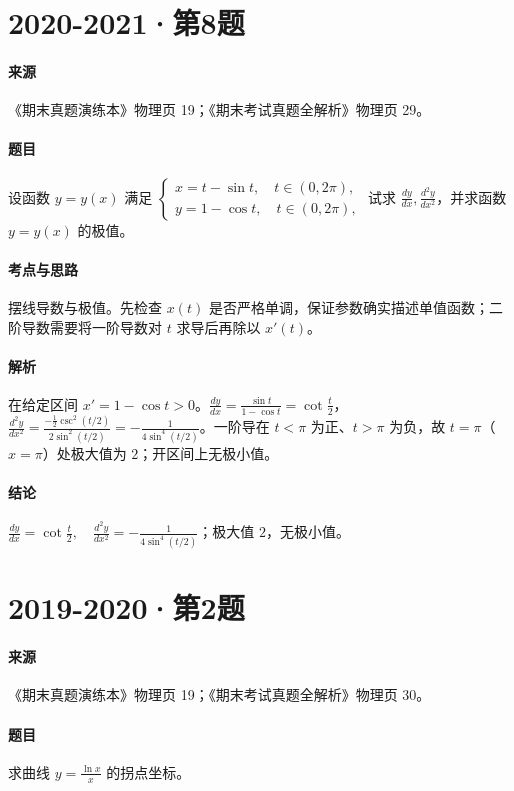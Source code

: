 \documentclass[UTF8,fontset=fandol,12pt,oneside,openany]{ctexrep}
\theoremstyle{definition}
\begin{document}
\par\addvspace{18pt}\noindent\begin{minipage}{\linewidth}
\section{2020-2021·第8题}
\paragraph{来源}《期末真题演练本》物理页 19；《期末考试真题全解析》物理页 29。
\paragraph{题目}
设函数 $y=y(x)$ 满足 $\begin{cases}x=t-\sin t,\quad t\in(0,2\pi),\\y=1-\cos t,\quad t\in(0,2\pi),\end{cases}$ 试求 $\frac{dy}{dx},\frac{d^2y}{dx^2}$，并求函数 $y=y(x)$ 的极值。
\end{minipage}\par
\paragraph{考点与思路}
摆线导数与极值。先检查 $x(t)$ 是否严格单调，保证参数确实描述单值函数；二阶导数需要将一阶导数对 $t$ 求导后再除以 $x'(t)$。
\paragraph{解析}
在给定区间 $x'=1-\cos t>0$。$\frac{dy}{dx}=\frac{\sin t}{1-\cos t}=\cot\frac t2$，$\frac{d^2y}{dx^2}=\frac{-\frac12\csc^2(t/2)}{2\sin^2(t/2)}=-\frac1{4\sin^4(t/2)}$。一阶导在 $t<\pi$ 为正、$t>\pi$ 为负，故 $t=\pi$（$x=\pi$）处极大值为 $2$；开区间上无极小值。
\paragraph{结论}
$\frac{dy}{dx}=\cot\frac t2,\quad\frac{d^2y}{dx^2}=-\frac1{4\sin^4(t/2)}$；极大值 $2$，无极小值。

\par\addvspace{18pt}\noindent\begin{minipage}{\linewidth}
\section{2019-2020·第2题}
\paragraph{来源}《期末真题演练本》物理页 19；《期末考试真题全解析》物理页 30。
\paragraph{题目}
求曲线 $y=\frac{\ln x}x$ 的拐点坐标。
\end{minipage}\par
\end{document}
